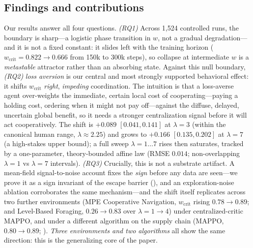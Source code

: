 \documentclass[letterpaper]{article}
\theoremstyle{plain}
\newcommand{\wcrit}{w_{\mathrm{crit}}}
\begin{document}
\subsection{Findings and contributions}
Our results answer all four questions. \emph{(RQ1)} Across 1{,}524 controlled
runs, the boundary is sharp---a logistic phase transition in $w$, not a gradual
degradation---and it is not a fixed constant: it slides left with the training
horizon
($\wcrit = 0.822\!\to\!0.666$ from 150k to 300k steps), so collapse at
intermediate $w$ is a \emph{metastable} attractor rather than an absorbing
state. Against this null boundary, \emph{(RQ2)} \emph{loss aversion} is our
central and most strongly supported behavioral effect: it shifts $\wcrit$
\emph{right}, \emph{impeding} coordination. The intuition is that a loss-averse
agent over-weights the immediate, certain local cost of cooperating---paying a
holding cost, ordering when it might not pay off---against the diffuse, delayed,
uncertain global benefit, so it needs a stronger centralization signal before it
will act cooperatively. The shift is $+0.089$ $[0.041, 0.141]$ at $\lambda{=}3$
(within the canonical human range, $\lambda\approx2.25$) and grows to
$+0.166$ $[0.135, 0.202]$ at $\lambda{=}7$ (a high-stakes upper bound); a full
sweep $\lambda{=}1{\ldots}7$ rises then saturates, tracked by a one-parameter,
theory-bounded affine law (RMSE $0.014$; non-overlapping $\lambda{=}1$ vs
$\lambda{=}7$ intervals). \emph{(RQ3)} Crucially, this is not a substrate
artifact. A mean-field signal-to-noise account fixes the \emph{sign} before any
data are seen---we prove it as a sign invariant of the escape barrier
(), and an exploration-noise ablation corroborates the same
mechanism---and the shift itself replicates across two further
environments (MPE Cooperative Navigation, $\wcrit$ rising $0.78\!\to\!0.89$; and
Level-Based Foraging, $0.26\!\to\!0.83$ over $\lambda{=}1\!\to\!4$) under
centralized-critic MAPPO, and under a different algorithm on the supply
chain (MAPPO, $0.80\!\to\!0.89$; ). \emph{Three
environments and two algorithms} all show the same direction: this is the
generalizing core of the paper.
\end{document}
